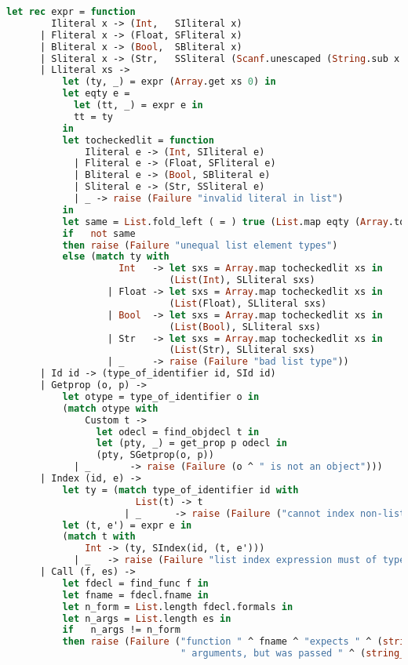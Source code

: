 \begin{lstlisting}[language=Caml,backgroundcolor=\color{backgroundcolor}]
    let rec expr = function
        Iliteral x -> (Int,   SIliteral x)
      | Fliteral x -> (Float, SFliteral x)
      | Bliteral x -> (Bool,  SBliteral x)
      | Sliteral x -> (Str,   SSliteral (Scanf.unescaped (String.sub x 1 ((String.length x) - 2))))
      | Lliteral xs ->
          let (ty, _) = expr (Array.get xs 0) in
          let eqty e =
            let (tt, _) = expr e in
            tt = ty
          in
          let tocheckedlit = function 
              Iliteral e -> (Int, SIliteral e)
            | Fliteral e -> (Float, SFliteral e)
            | Bliteral e -> (Bool, SBliteral e)
            | Sliteral e -> (Str, SSliteral e)
            | _ -> raise (Failure "invalid literal in list")
          in
          let same = List.fold_left ( = ) true (List.map eqty (Array.to_list xs)) in
          if   not same
          then raise (Failure "unequal list element types")
          else (match ty with
                    Int   -> let sxs = Array.map tocheckedlit xs in
                             (List(Int), SLliteral sxs)
                  | Float -> let sxs = Array.map tocheckedlit xs in
                             (List(Float), SLliteral sxs)
                  | Bool  -> let sxs = Array.map tocheckedlit xs in
                             (List(Bool), SLliteral sxs)
                  | Str   -> let sxs = Array.map tocheckedlit xs in
                             (List(Str), SLliteral sxs)
                  | _     -> raise (Failure "bad list type"))
      | Id id -> (type_of_identifier id, SId id)
      | Getprop (o, p) ->
          let otype = type_of_identifier o in
          (match otype with
              Custom t ->
                let odecl = find_objdecl t in
                let (pty, _) = get_prop p odecl in
                (pty, SGetprop(o, p))
            | _       -> raise (Failure (o ^ " is not an object")))
      | Index (id, e) ->
          let ty = (match type_of_identifier id with
                       List(t) -> t
                     | _      -> raise (Failure ("cannot index non-list variable " ^ id))) in
          let (t, e') = expr e in
          (match t with
              Int -> (ty, SIndex(id, (t, e')))
            | _   -> raise (Failure "list index expression must of type int"))
      | Call (f, es) ->
          let fdecl = find_func f in
          let fname = fdecl.fname in
          let n_form = List.length fdecl.formals in
          let n_args = List.length es in
          if   n_args != n_form
          then raise (Failure ("function " ^ fname ^ "expects " ^ (string_of_int n_form) ^
                               " arguments, but was passed " ^ (string_of_int n_args)))

\end{lstlisting}
